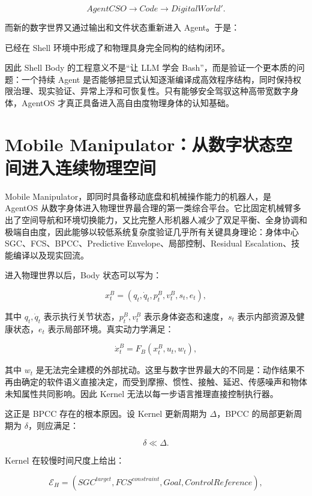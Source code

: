 $$
AgentCSO
\rightarrow
Code
\rightarrow
DigitalWorld'.
$$

而新的数字世界又通过输出和文件状态重新进入 Agent。于是：

\begin{statementbox}
\centering
{}
\end{statementbox}

已经在 Shell 环境中形成了和物理具身完全同构的结构闭环。

因此 Shell Body 的工程意义不是“让 LLM 学会 Bash”，而是验证一个更本质的问题：一个持续 Agent 是否能够把显式认知逐渐编译成高效程序结构，同时保持权限治理、现实验证、异常上浮和可恢复性。只有能够安全驾驭这种高带宽数字身体，AgentOS 才真正具备进入高自由度物理身体的认知基础。

\section{Mobile Manipulator：从数字状态空间进入连续物理空间}

Mobile Manipulator，即同时具备移动底盘和机械操作能力的机器人，是 AgentOS 从数字身体进入物理世界最合理的第一类综合平台。它比固定机械臂多出了空间导航和环境切换能力，又比完整人形机器人减少了双足平衡、全身协调和极端自由度，因此能够以较低系统复杂度验证几乎所有关键具身理论：身体中心 SGC、FCS、BPCC、Predictive Envelope、局部控制、Residual Escalation、技能编译以及现实回流。

进入物理世界以后，Body 状态可以写为：

$$
x_t^B
=
(
q_t,\dot q_t,
p_t^B,
v_t^B,
s_t,
e_t
),
$$

其中 $q_t,\dot q_t$ 表示执行关节状态，$p_t^B,v_t^B$ 表示身体姿态和速度，$s_t$ 表示内部资源及健康状态，$e_t$ 表示局部环境。真实动力学满足：

$$
\dot x_t^B
=
F_B(x_t^B,u_t,w_t),
$$

其中 $w_t$ 是无法完全建模的外部扰动。这里与数字世界最大的不同是：动作结果不再由确定的软件语义直接决定，而受到摩擦、惯性、接触、延迟、传感噪声和物体未知属性共同影响。因此 Kernel 无法以每一步语言推理直接控制执行器。

这正是 BPCC 存在的根本原因。设 Kernel 更新周期为 $\Delta$，BPCC 的局部更新周期为 $\delta$，则应满足：

$$
\delta\ll\Delta.
$$

Kernel 在较慢时间尺度上给出：

$$
\mathcal E_H
=
(
SGC^{target},
FCS^{constraint},
Goal,
ControlReference
),
$$

